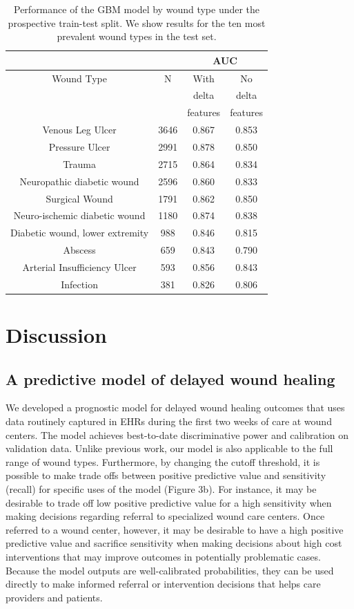 \begin{table}
\begin{center}
\begin{tabular}{|c|c|c|c||}
\hline
&  & \multicolumn{2}{|c|}{AUC} \\
\hline
Wound Type & N & With & No \\
& & delta & delta \\
& & features & features \\
\hline \hline
Venous Leg Ulcer & 3646	& 0.867 & 0.853 \\
Pressure Ulcer & 2991 & 0.878 & 0.850 \\
Trauma & 2715& 0.864 & 0.834 \\
Neuropathic diabetic wound & 2596 & 0.860 & 0.833 \\
Surgical Wound & 1791 & 0.862  & 0.850 \\
Neuro-ischemic diabetic wound & 1180 & 0.874 & 0.838\\
Diabetic wound, lower extremity & 988 & 0.846 & 0.815\\
Abscess & 659 & 0.843 & 0.790 \\
Arterial Insufficiency Ulcer & 593& 0.856 & 0.843 \\
Infection & 381 & 0.826 & 0.806 \\
\hline
\end{tabular}
\end{center}
\caption[Performance of GBM by wound type, prospective
  split]{Performance of the GBM model by wound type under the
  prospective train-test split.  We show results for the ten most
  prevalent wound types in the test set.}
\end{table}

\section{Discussion}
\subsection{A predictive model of delayed wound healing}
We developed a prognostic model for delayed wound healing outcomes
that uses data routinely captured in EHRs during the first two weeks
of care at wound centers.  The model achieves best-to-date
discriminative power and calibration on validation data.  Unlike
previous work, our model is also applicable to the full range of wound
types.  Furthermore, by changing the cutoff threshold, it is possible
to make trade offs between positive predictive value and sensitivity
(recall) for specific uses of the model (Figure 3b).  For instance, it
may be desirable to trade off low positive predictive value for a high
sensitivity when making decisions regarding referral to specialized
wound care centers.  Once referred to a wound center, however, it may
be desirable to have a high positive predictive value and sacrifice
sensitivity when making decisions about high cost interventions that
may improve outcomes in potentially problematic cases.  Because the
model outputs are well-calibrated probabilities, they can be used
directly to make informed referral or intervention decisions that
helps care providers and patients.

